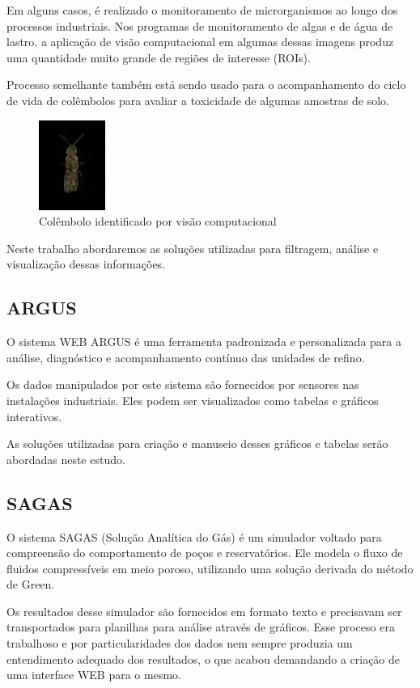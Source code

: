 \documentclass[]{article}
\begin{document}
Em alguns casos, é realizado o monitoramento de microrganismos ao longo dos processos industriais. Nos programas de monitoramento de algas e de água de lastro, a aplicação de visão computacional em algumas dessas imagens produz uma quantidade muito grande de regiões de interesse (ROIs).

Processo semelhante também está sendo usado para o acompanhamento do ciclo de vida de colêmbolos para avaliar a toxicidade de algumas amostras de solo.

\begin{figure}[!ht]
\centering
\includegraphics[scale=1]{./image-diff13-12-crop}
\caption[]{Colêmbolo identificado por visão computacional}
\label{fig:image-diff13-12-crop}
\end{figure}

Neste trabalho abordaremos as soluções utilizadas para filtragem, análise e visualização dessas informações.

\subsection{ARGUS}

O sistema WEB ARGUS é uma ferramenta padronizada e personalizada para a análise, diagnóstico e acompanhamento contínuo das unidades de refino.

Os dados manipulados por este sistema são fornecidos por sensores nas instalações industriais. Eles podem ser visualizados como tabelas e gráficos interativos.

As soluções utilizadas para criação e manuseio desses gráficos e tabelas serão abordadas neste estudo.

\subsection{SAGAS}

O sistema SAGAS (Solução Analítica do Gás) é um simulador voltado para compreensão do comportamento de poços e reservatórios. Ele modela o fluxo de fluidos compressíveis em meio poroso, utilizando uma solução derivada do método de Green. \cite{145468-PA}

Os resultados desse simulador são fornecidos em formato texto e precisavam ser transportados para planilhas para análise através de gráficos. Esse proceso era trabalhoso e por particularidades dos dados nem sempre produzia um entendimento adequado dos resultados, o que acabou demandando a criação de uma interface WEB para o mesmo.
\end{document}

